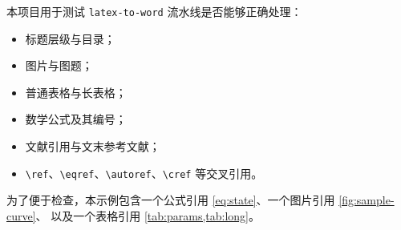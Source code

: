 本项目用于测试 \texttt{latex-to-word} 流水线是否能够正确处理：

\begin{itemize}
    \item 标题层级与目录；
    \item 图片与图题；
    \item 普通表格与长表格；
    \item 数学公式及其编号；
    \item 文献引用与文末参考文献；
    \item \verb|\ref|、\verb|\eqref|、\verb|\autoref|、\verb|\cref| 等交叉引用。
\end{itemize}

为了便于检查，本示例包含一个公式引用 \eqref{eq:state}、一个图片引用 \autoref{fig:sample-curve}、
以及一个表格引用 \cref{tab:params,tab:long}。
